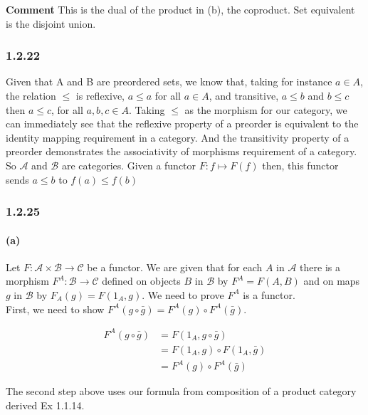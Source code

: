 \documentclass{article}
\begin{document}
\textbf{Comment} This is the dual of the product in (b), the coproduct. Set equivalent is the disjoint union.

\subsubsection*{1.2.22}

Given that A and B are preordered sets, we know that, taking for instance $a \in A$, the relation $\leq$ is reflexive, $a \leq a$ for all $a \in A$, and transitive, $a \leq b$ and $b \leq c$ then $a \leq c$, for all $a, b, c \in A$.  Taking $\leq$ as the morphism for our category, we can immediately see that the reflexive property of a preorder is equivalent to the identity mapping requirement in a category. And the transitivity property of a preorder demonstrates the associativity of morphisms requirement of a category. So $\mathcal{A}$ and $\mathcal{B}$ are categories. Given a functor $F: f \mapsto F(f)$ then, this functor sends $a \leq b$ to $f(a) \leq f(b)$

\subsubsection*{1.2.25}

\paragraph{(a)}

Let $F: \mathcal{A} \times \mathcal{B} \rightarrow \mathcal{C}$ be a functor. We are given that for each $A$ in $\mathcal{A}$ there is a morphism $F^A: \mathcal{B} \rightarrow \mathcal{C}$ defined on objects $B$ in $\mathcal{B}$ by $F^A = F(A,B)$ and on maps $g$ in $\mathcal{B}$  by $F_A(g) = F(1_A, g)$. We need to prove $F^A$ is a functor.\\

First, we need to show  $F^A(g \circ \bar{g}) = F^A(g) \circ F^A(\bar{g})$.

\begin{align*}
  F^A(g \circ \bar{g})&= F(1_A, g \circ \bar{g})  \\
                           &= F(1_A,g) \circ F(1_A,\bar{g}) \\
                           &= F^A(g) \circ F^A(\bar{g})
\end{align*}

The second step above uses our formula from composition of a product category derived Ex 1.1.14. \\
\end{document}
